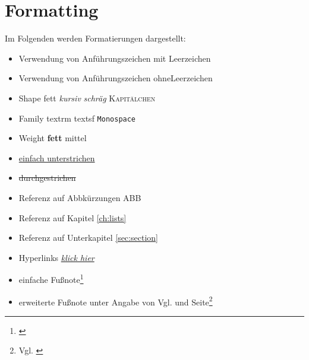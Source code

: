 \chapter{Formatting}
\label{ch:formatting}

Im Folgenden werden Formatierungen dargestellt:

\begin{itemize}
	\item{Verwendung von Anführungszeichen \glqq{}mit\grqq{} Leerzeichen}
	\item{Verwendung von Anführungszeichen \glqq ohne\grqq Leerzeichen}
	\item{Shape \textup{fett} \textit{kursiv} \textsl{schräg} \textsc{Kapitälchen}}
	\item{Family \textrm{textrm} \textsf{textsf}  \texttt{Monospace}}
	\item{Weight \textbf{fett} \textmd{mittel}}
	\item{\uline{einfach unterstrichen} }
	\item{ \sout{durchgestrichen} }
	\item{Referenz auf Abbkürzungen \ac{ABB}}
	\item{Referenz auf Kapitel \ref{ch:lists}}
	\item{Referenz auf Unterkapitel \ref{sec:section}}
	\item{Hyperlinks \href{https://google.com}{\textit{klick hier}}}
	\item{einfache Fußnote\footnote{\cite{lammenett}}}
	\item{erweiterte Fußnote unter Angabe von \glqq{}Vgl.\grqq{} und Seite\footnote{Vgl. \cite[S. 11f]{lammenett}}}
\end{itemize}